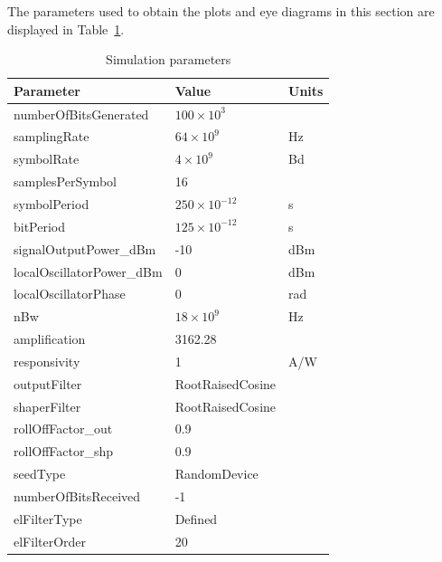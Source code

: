 	The parameters used to obtain the plots and eye diagrams
	in this section are displayed in Table~\ref{tab:noNoiseSimParams}.

	\begin{longtable}[h]{|l|l|l|}
		\caption{Simulation parameters\label{tab:noNoiseSimParams}}\\\hline
		\textbf{Parameter}            & \textbf{Value}       &\textbf{Units}\\\hline
		numberOfBitsGenerated         & $100 \times 10^3$    & \\\hline
		samplingRate                  & $64 \times 10^9$     & Hz \\\hline
		symbolRate                    & $4 \times 10^9$      & Bd \\\hline
		samplesPerSymbol              & 16                   & \\\hline
		symbolPeriod                  & $250\times 10^{-12}$ & s\\\hline
		bitPeriod                     & $125\times 10^{-12}$ & s\\\hline
		signalOutputPower\_dBm        & -10                  & dBm\\\hline
		localOscillatorPower\_dBm     & 0                    & dBm\\\hline
		localOscillatorPhase          & 0                    & rad\\\hline
		nBw                           & $18\times10^9$       & Hz\\\hline
		amplification                 & 3162.28              & \\\hline
		responsivity                  & 1                    & A/W\\\hline
		outputFilter                  & RootRaisedCosine     & \\\hline
		shaperFilter                  & RootRaisedCosine     & \\\hline
		rollOffFactor\_out            & 0.9                  & \\\hline
		rollOffFactor\_shp            & 0.9                  & \\\hline
		seedType                      & RandomDevice         & \\\hline
		numberOfBitsReceived          & -1                   & \\\hline
		elFilterType                  & Defined              & \\\hline
		elFilterOrder                 & 20                   & \\\hline

\end{longtable}

